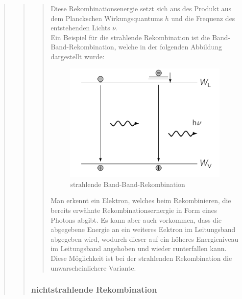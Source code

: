 \begin{quote}
\begin{quote}
\begin{quote}
            Diese Rekombinationsenergie setzt sich aus des Produkt aus dem
            Planckschen Wirkungsquantums $h$ und die Frequenz des entstehenden
            Lichts $\nu$.\\

            Ein Beispiel für die strahlende Rekombination ist die
            Band-Band-Rekombination, welche in der folgenden Abbildung
            dargestellt wurde:

            \begin{figure}[H]
                    \centering
                        \includegraphics[scale=0.68, trim = 1cm 0cm 1.5cm 0cm,
                        clip]{./Emissionsbilder/restliches/bandband.png}
                        \caption{strahlende Band-Band-Rekombination}
                            \label{fig:./Emissionsbilder/restliches/direk2.png}
            \end{figure}

            Man erkennt ein Elektron, welches beim Rekombinieren, die bereits
            erwähnte Rekombinationsernergie in Form eines Photons abgibt. Es
            kann aber auch vorkommen, dass die abgegebene Energie an ein
            weiteres Eektron im Leitungsband abgegeben wird, wodurch dieser auf
            ein höheres Energieniveau im Leitungsband angehoben und wieder runterfallen
            kann. Diese Möglichkeit ist bei der strahlenden Rekombination die
            unwarscheinlichere Variante.

            \end{quote}

            \subsubsection{nichtstrahlende Rekombination}
            \begin{quote}


\end{quote}
\end{quote}
\end{quote}
